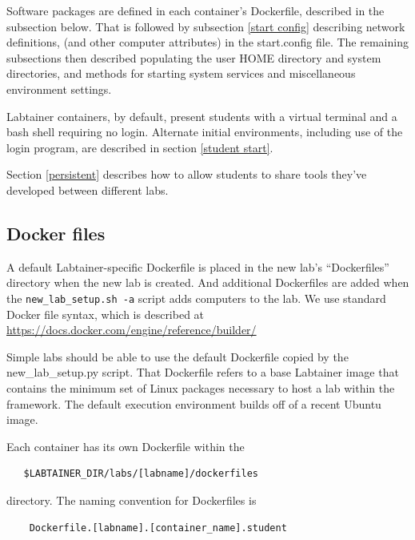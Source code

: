 \documentclass[12pt]{article}
\begin{document}
Software packages are defined in each container's Dockerfile, described in 
the subsection below. That is followed by subsection \ref{start config} describing network definitions,
(and other computer attributes) in the start.config file.  The remaining subsections then
described populating the user HOME directory and system directories, and methods for starting 
system services and miscellaneous environment settings. 

Labtainer containers, by default, present students with a virtual terminal and a bash
shell requiring no login.  Alternate initial environments, including use of the login program, are
described in section \ref{student start}.

Section \ref{persistent} describes how to
allow students to share tools they've developed between different labs.  

\subsection {Docker files}
A default Labtainer-specific Dockerfile is placed in the new lab's ``Dockerfiles'' 
directory when the new lab is created.  And additional Dockerfiles are added when the
{\tt new\_lab\_setup.sh -a} script adds computers to the lab. We use standard Docker file syntax, which is described at 
\url{https://docs.docker.com/engine/reference/builder/}

Simple labs should be able to use the default Dockerfile copied by the 
new\_lab\_setup.py script.  That Dockerfile refers to a base Labtainer
image that contains the minimum set of Linux packages necessary to 
host a lab within the framework.  The default
execution environment builds off of a recent Ubuntu image.

\noindent Each container has its own Dockerfile within the 
\begin{verbatim}
   $LABTAINER_DIR/labs/[labname]/dockerfiles
\end{verbatim}
\noindent directory.  The naming convention for Dockerfiles is
\begin{verbatim}
    Dockerfile.[labname].[container_name].student
\end{verbatim}
\end{document}
